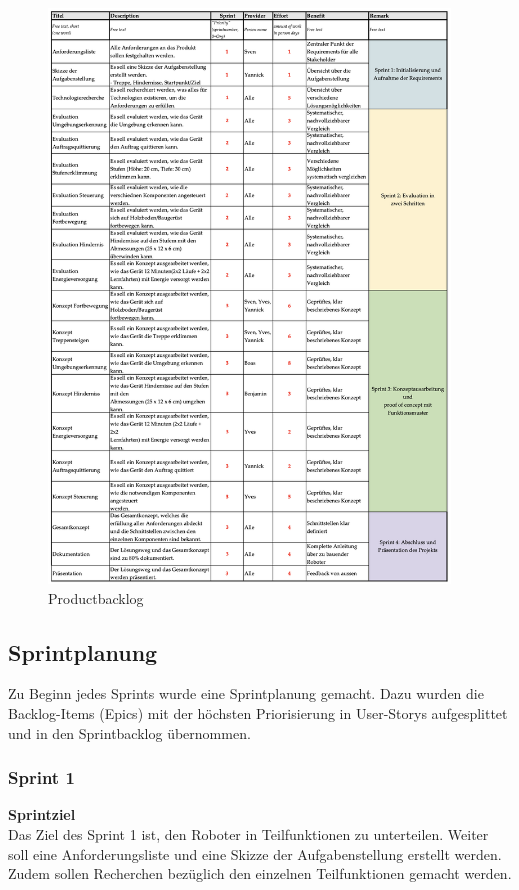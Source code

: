 \begin{figure}[H]
  \includegraphics[width=0.95\textwidth]{img/projektmanagement/Backlog.png}
  \centering
  \caption{Productbacklog}
  \label{fig:productbacklog}
\end{figure}


\subsection{Sprintplanung}
Zu Beginn jedes Sprints wurde eine Sprintplanung gemacht. Dazu wurden die Backlog-Items (Epics) mit der höchsten Priorisierung in User-Storys aufgesplittet und in den Sprintbacklog übernommen. 

\subsubsection{Sprint 1}
\textbf{Sprintziel}\\
Das Ziel des Sprint 1 ist, den Roboter in Teilfunktionen zu unterteilen. Weiter soll eine Anforderungsliste und eine Skizze der Aufgabenstellung erstellt werden. Zudem sollen Recherchen bezüglich den einzelnen Teilfunktionen gemacht werden.

